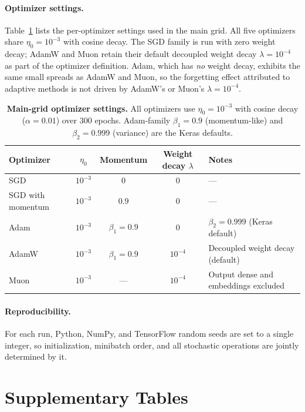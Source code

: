 \documentclass{article}
\begin{document}
\paragraph{Optimizer settings.}
Table~\ref{tab:opt_specs} lists the per-optimizer settings used in the
main grid. All five optimizers share $\eta_0=10^{-3}$ with cosine decay.
The SGD family is run with zero weight decay; AdamW and Muon retain
their default decoupled weight decay $\lambda=10^{-4}$ as part of the
optimizer definition. Adam, which has \emph{no} weight decay, exhibits
the same small spreads as AdamW and Muon, so the forgetting effect
attributed to adaptive methods is not driven by AdamW's or Muon's
$\lambda=10^{-4}$.

\begin{table}[h]
\centering\small
\caption{\textbf{Main-grid optimizer settings.}
All optimizers use $\eta_0=10^{-3}$ with cosine decay
($\alpha=0.01$) over $300$ epochs. Adam-family $\beta_1=0.9$
(momentum-like) and $\beta_2=0.999$ (variance) are the Keras defaults.}
\label{tab:opt_specs}
\begin{tabular}{lcccl}
\toprule
Optimizer & $\eta_0$ & Momentum & Weight decay $\lambda$ & Notes \\
\midrule
SGD              & $10^{-3}$ & $0$    & $0$       & --- \\
SGD with momentum & $10^{-3}$ & $0.9$  & $0$       & --- \\
Adam             & $10^{-3}$ & $\beta_1{=}0.9$ & $0$ & $\beta_2{=}0.999$ (Keras default) \\
AdamW            & $10^{-3}$ & $\beta_1{=}0.9$ & $10^{-4}$ & Decoupled weight decay (default) \\
Muon             & $10^{-3}$ & ---    & $10^{-4}$ & Output dense and embeddings excluded \\
\bottomrule
\end{tabular}
\end{table}

\paragraph{Reproducibility.}
For each run, Python, NumPy, and TensorFlow random seeds are set to a
single integer, so initialization, minibatch order, and all stochastic
operations are jointly determined by it. 

\section{Supplementary Tables}\label{app:tables}
\end{document}
